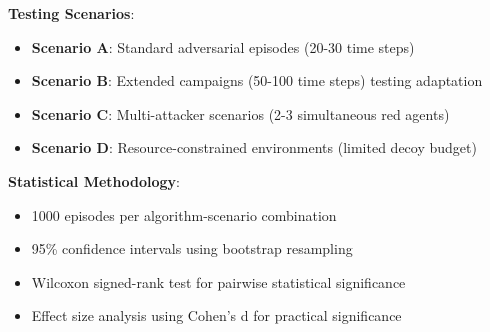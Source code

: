 \documentclass[12pt,oneside]{article}
\begin{document}
\textbf{Testing Scenarios}:
\begin{itemize}
    \item \textbf{Scenario A}: Standard adversarial episodes (20-30 time steps)
    \item \textbf{Scenario B}: Extended campaigns (50-100 time steps) testing adaptation
    \item \textbf{Scenario C}: Multi-attacker scenarios (2-3 simultaneous red agents)
    \item \textbf{Scenario D}: Resource-constrained environments (limited decoy budget)
\end{itemize}

\textbf{Statistical Methodology}:
\begin{itemize}
    \item 1000 episodes per algorithm-scenario combination
    \item 95\% confidence intervals using bootstrap resampling
    \item Wilcoxon signed-rank test for pairwise statistical significance
    \item Effect size analysis using Cohen's d for practical significance
\end{itemize}
\end{document}
